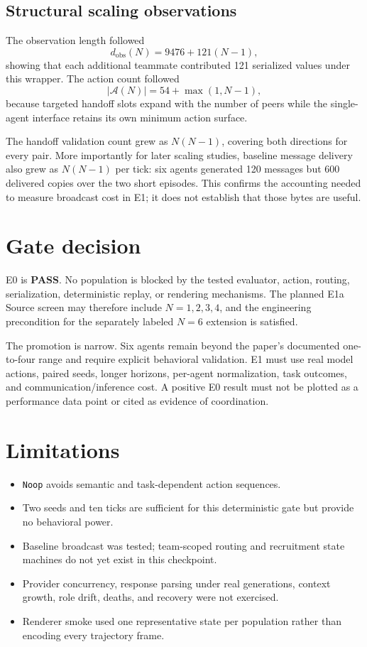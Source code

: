 \documentclass[11pt]{article}
\newcommand{\pass}{\textcolor{passgreen}{\textbf{PASS}}}
\newcommand{\code}[1]{\texttt{#1}}
\begin{document}
\subsection{Structural scaling observations}

The observation length followed
\[
d_{\mathrm{obs}}(N)=9476+121(N-1),
\]
showing that each additional teammate contributed 121 serialized values under
this wrapper.  The action count followed
\[
|\mathcal{A}(N)|=54+\max(1,N-1),
\]
because targeted handoff slots expand with the number of peers while the
single-agent interface retains its own minimum action surface.

The handoff validation count grew as $N(N-1)$, covering both directions for
every pair.  More importantly for later scaling studies, baseline message
delivery also grew as $N(N-1)$ per tick: six agents generated 120 messages but
600 delivered copies over the two short episodes.  This confirms the accounting
needed to measure broadcast cost in E1; it does not establish that those bytes
are useful.

\section{Gate decision}

E0 is \pass.  No population is blocked by the tested evaluator, action, routing,
serialization, deterministic replay, or rendering mechanisms.  The planned E1a
Source screen may therefore include $N=1,2,3,4$, and the engineering precondition
for the separately labeled $N=6$ extension is satisfied.

The promotion is narrow.  Six agents remain beyond the paper's documented
one-to-four range and require explicit behavioral validation.  E1 must use real
model actions, paired seeds, longer horizons, per-agent normalization, task
outcomes, and communication/inference cost.  A positive E0 result must not be
plotted as a performance data point or cited as evidence of coordination.

\section{Limitations}

\begin{itemize}
  \item \code{Noop} avoids semantic and task-dependent action sequences.
  \item Two seeds and ten ticks are sufficient for this deterministic gate but
  provide no behavioral power.
  \item Baseline broadcast was tested; team-scoped routing and recruitment state
  machines do not yet exist in this checkpoint.
  \item Provider concurrency, response parsing under real generations, context
  growth, role drift, deaths, and recovery were not exercised.
  \item Renderer smoke used one representative state per population rather than
  encoding every trajectory frame.
\end{itemize}
\end{document}

